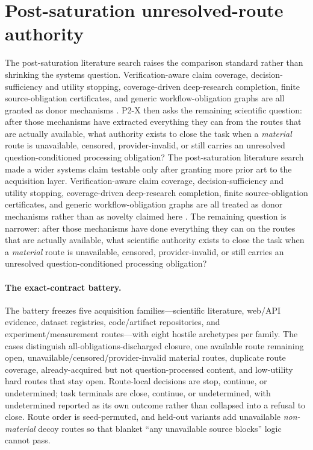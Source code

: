 \section{Post-saturation unresolved-route authority}
\label{sec:p2x}

The post-saturation literature search raises the comparison standard rather than shrinking the systems question. Verification-aware claim coverage, decision-sufficiency and utility stopping, coverage-driven deep-research completion, finite source-obligation certificates, and generic workflow-obligation graphs are all granted as donor mechanisms \cite{halt2026,knowplan2026,donotstopearly2026,confidencebasedstop2026,icore2026}. P2-X then asks the remaining scientific question: after those mechanisms have extracted everything they can from the routes that are actually available, what authority exists to close the task when a \emph{material} route is unavailable, censored, provider-invalid, or still carries an unresolved question-conditioned processing obligation?
The post-saturation literature search made a wider systems claim testable only after granting more prior art to the acquisition layer. Verification-aware claim coverage, decision-sufficiency and utility stopping, coverage-driven deep-research completion, finite source-obligation certificates, and generic workflow-obligation graphs are all treated as donor mechanisms rather than as novelty claimed here \cite{halt2026,knowplan2026,donotstopearly2026,confidencebasedstop2026,icore2026}. The remaining question is narrower: after those mechanisms have done everything they can on the routes that are actually available, what scientific authority exists to close the task when a \emph{material} route is unavailable, censored, provider-invalid, or still carries an unresolved question-conditioned processing obligation?

\paragraph{The exact-contract battery.}
The battery freezes five acquisition families---scientific literature, web/API evidence, dataset registries, code/artifact repositories, and experiment/measurement routes---with eight hostile archetypes per family. The cases distinguish all-obligations-discharged closure, one available route remaining open, unavailable/censored/provider-invalid material routes, duplicate route coverage, already-acquired but not question-processed content, and low-utility hard routes that stay open. Route-local decisions are stop, continue, or undetermined; task terminals are close, continue, or undetermined, with undetermined reported as its own outcome rather than collapsed into a refusal to close. Route order is seed-permuted, and held-out variants add unavailable \emph{non-material} decoy routes so that blanket ``any unavailable source blocks'' logic cannot pass.

